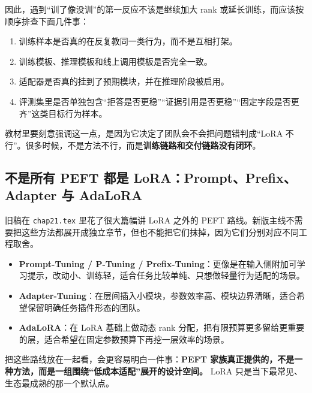 因此，遇到“训了像没训”的第一反应不该是继续加大 rank 或延长训练，而应该按顺序排查下面几件事：
\begin{enumerate}
  \item 训练样本是否真的在反复教同一类行为，而不是互相打架。
  \item 训练模板、推理模板和线上调用模板是否完全一致。
  \item 适配器是否真的挂到了预期模块，并在推理阶段被启用。
  \item 评测集里是否单独包含“拒答是否更稳”“证据引用是否更稳”“固定字段是否更齐”这类目标行为样本。
\end{enumerate}

教材里要刻意强调这一点，是因为它决定了团队会不会把问题错判成“LoRA 不行”。很多时候，不是方法不行，而是\textbf{训练链路和交付链路没有闭环}。

\subsection{不是所有 PEFT 都是 LoRA：Prompt、Prefix、Adapter 与 AdaLoRA}
旧稿在 \texttt{chap21.tex} 里花了很大篇幅讲 LoRA 之外的 PEFT 路线。新版主线不需要把这些方法都展开成独立章节，但也不能把它们抹掉，因为它们分别对应不同工程取舍。
\begin{itemize}
  \item \textbf{Prompt-Tuning / P-Tuning / Prefix-Tuning}：更像是在输入侧附加可学习提示，改动小、训练轻，适合任务比较单纯、只想做轻量行为适配的场景。
  \item \textbf{Adapter-Tuning}：在层间插入小模块，参数效率高、模块边界清晰，适合希望保留明确任务插件形态的团队。
  \item \textbf{AdaLoRA}：在 LoRA 基础上做动态 rank 分配，把有限预算更多留给更重要的层，适合希望在固定参数预算下再挖一层效率的场景。
\end{itemize}

把这些路线放在一起看，会更容易明白一件事：\textbf{PEFT 家族真正提供的，不是一种方法，而是一组围绕“低成本适配”展开的设计空间。} LoRA 只是当下最常见、生态最成熟的那一个默认点。

